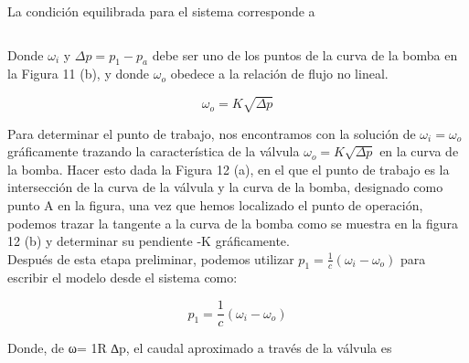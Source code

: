 \documentclass[a4paper,12pt,twoside]{proyectotanquesecci}
\begin{document}
La condición equilibrada para el sistema corresponde a 

\begin{equation}
\end{equation}

Donde $\omega_{i}$ y $\Delta p=p_{1}-p_{a}$ debe ser uno de los puntos de la curva de la bomba en la Figura 11 (b), y donde $\omega_{o}$ obedece a la relación de flujo no lineal.

\begin{equation}
\omega_{o}=K\sqrt{\Delta p}
\end{equation}

Para determinar el punto de trabajo, nos encontramos con la solución de  $\omega_{i}=\omega_{o}$  gráficamente trazando la característica de la válvula  $\omega_{o}=K\sqrt{\Delta p}$  en la curva de la bomba. Hacer esto dada la Figura 12 (a), en el que el punto de trabajo es la intersección de la curva de la válvula y la curva de la bomba, designado como punto A en la figura, una vez que hemos localizado el punto de operación, podemos trazar la tangente a la curva de la bomba como se muestra en la figura 12 (b) y determinar su pendiente -K gráficamente. \\



Después de esta etapa preliminar, podemos utilizar $p_{1}=\frac{1}{c} \left(\omega_{i}-\omega_{o}\right)$ para escribir el modelo desde el sistema como:

\begin{equation}
p_{1}=\frac{1}{c} \left(\omega_{i}-\omega_{o}\right)
\end{equation}

Donde, de ω= 1R ∆p, el caudal aproximado a través de la válvula es 
\end{document}
